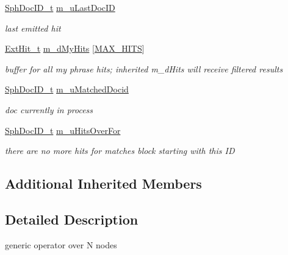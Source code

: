 \begin{DoxyCompactItemize}
\hyperlink{sphinx_8h_a3176771631c12a9e4897272003e6b447}{Sph\-Doc\-I\-D\-\_\-t} \hyperlink{classExtNWayT_a48e5113ea25eec491cd4b08dfb5b595a}{m\-\_\-u\-Last\-Doc\-I\-D}
\begin{DoxyCompactList}\small\item\em last emitted hit \end{DoxyCompactList}\item 
\hyperlink{structExtHit__t}{Ext\-Hit\-\_\-t} \hyperlink{classExtNWayT_a55b3fa362f8bb9279f43af23a29c0bda}{m\-\_\-d\-My\-Hits} \mbox{[}\hyperlink{classExtNode__i_a79b81cba51253fdbe56fd3595fac9ab4}{M\-A\-X\-\_\-\-H\-I\-T\-S}\mbox{]}
\begin{DoxyCompactList}\small\item\em buffer for all my phrase hits; inherited m\-\_\-d\-Hits will receive filtered results \end{DoxyCompactList}\item 
\hyperlink{sphinx_8h_a3176771631c12a9e4897272003e6b447}{Sph\-Doc\-I\-D\-\_\-t} \hyperlink{classExtNWayT_a0193e0fa0a57905a1cf33035c58d8628}{m\-\_\-u\-Matched\-Docid}
\begin{DoxyCompactList}\small\item\em doc currently in process \end{DoxyCompactList}\item 
\hyperlink{sphinx_8h_a3176771631c12a9e4897272003e6b447}{Sph\-Doc\-I\-D\-\_\-t} \hyperlink{classExtNWayT_a1e61aa842a09f843fff56f95f5618cc1}{m\-\_\-u\-Hits\-Over\-For}
\begin{DoxyCompactList}\small\item\em there are no more hits for matches block starting with this I\-D \end{DoxyCompactList}\end{DoxyCompactItemize}
\subsection*{Additional Inherited Members}


\subsection{Detailed Description}
generic operator over N nodes 


